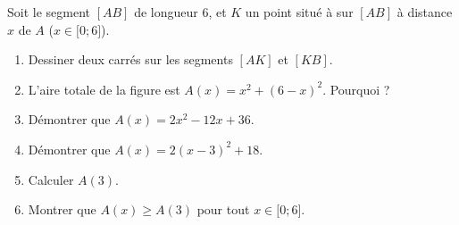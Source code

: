 
\begin{exercice}\label{exosmath-0046}

    Soit le segment \( [AB]\) de longueur \( 6\), et \( K\) un point situé à sur \( [AB]\) à distance \( x\) de \( A\) (\( x\in\mathopen[  0; 6 \mathclose]\)).
    \begin{multicols}{2}
    \begin{enumerate}
        \item
            Dessiner deux carrés sur les segments \( [AK]\) et \( [KB]\).
        \item
            L'aire totale de la figure est \( A(x)=x^2+(6-x)^2\). Pourquoi ?
        \item
            Démontrer que \( A(x)=2x^2-12x+36\).
        \item
            Démontrer que \( A(x)=2(x-3)^2+18\).
        \item
            Calculer \( A(3)\).
        \item
            Montrer que \( A(x)\geq A(3)\) pour tout \( x\in \mathopen[ 0; 6 \mathclose]\).
    \end{enumerate}
    \end{multicols}


\end{exercice}
